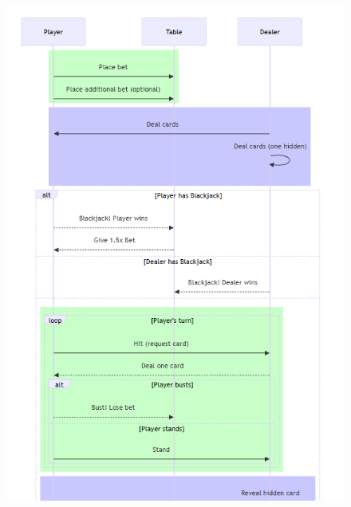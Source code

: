 \begin{figure}[!htb]
    \centering
    \includegraphics[scale=0.55]{report/img/sequenceDiagram.png}
    \label{fig:classDiagram}
\end{figure}
